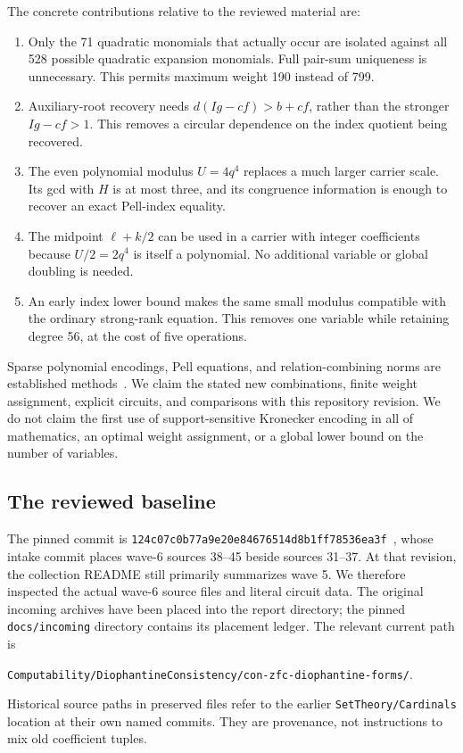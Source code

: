 \documentclass[11pt,a4paper]{article}
\newcommand{\pin}{\texttt{124c07c0b77a9e20e84676514d8b1ff78536ea3f}}
\theoremstyle{definition}
\theoremstyle{remark}
\numberwithin{equation}{section}
\begin{document}
The concrete contributions relative to the reviewed material are:
\begin{enumerate}
\item Only the 71 quadratic monomials that actually occur are isolated
against all 528 possible quadratic expansion monomials. Full pair-sum
uniqueness is unnecessary. This permits maximum weight 190 instead of 799.
\item Auxiliary-root recovery needs
$d(Ig-cf)>b+cf$, rather than the stronger $Ig-cf>1$.
This removes a circular dependence on the index quotient being recovered.
\item The even polynomial modulus $U=4q^4$ replaces a much larger carrier
scale. Its gcd with $H$ is at most three, and its congruence information
is enough to recover an exact Pell-index equality.
\item The midpoint $\ell+k/2$ can be used in a carrier with integer
coefficients because $U/2=2q^4$ is itself a polynomial. No additional
variable or global doubling is needed.
\item An early index lower bound makes the same small modulus compatible
with the ordinary strong-rank equation. This removes one variable while
retaining degree 56, at the cost of five operations.
\end{enumerate}
Sparse polynomial encodings, Pell equations, and relation-combining
norms are established methods~\cite{jones1982,sun2021,sun2026}.
We claim the stated new combinations,
finite weight assignment, explicit circuits, and comparisons with this
repository revision. We do not claim the first use of support-sensitive
Kronecker encoding in all of mathematics, an optimal weight assignment,
or a global lower bound on the number of variables.

\subsection{The reviewed baseline}

The pinned commit is \pin~\cite{repo}, whose intake commit places wave-6 sources
38--45 beside sources 31--37. At that revision, the collection README
still primarily summarizes wave 5. We therefore inspected the actual
wave-6 source files and literal circuit data. The original incoming
archives have been placed into the report directory; the pinned
\texttt{docs/incoming} directory contains its placement ledger.
The relevant current path is
\begin{center}
\small\texttt{Computability/DiophantineConsistency/con-zfc-diophantine-forms/}.
\end{center}
Historical source paths in preserved files refer to the earlier
\texttt{SetTheory/Cardinals} location at their own named commits. They are
provenance, not instructions to mix old coefficient tuples.
\end{document}
